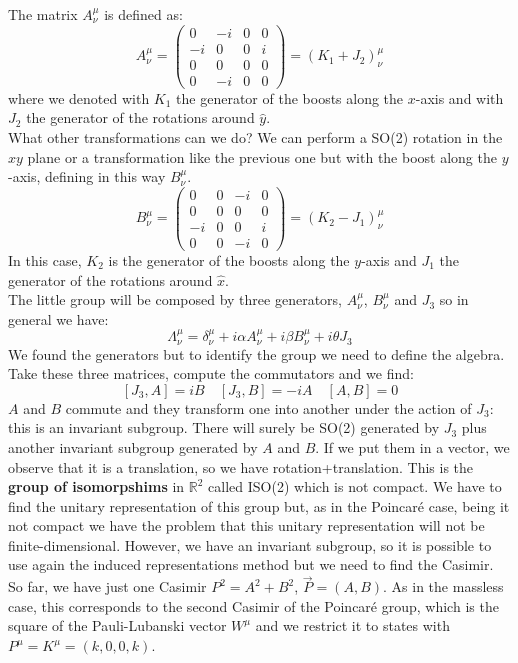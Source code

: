 \documentclass[../main.tex]{subfiles}
\begin{document}
The matrix $A^\mu_\nu$ is defined as:
\[
A^\mu_\nu=\left(\begin{array}{cccc}
    0 & -i & 0 & 0 \\
    -i & 0 & 0 & i \\
    0 & 0 & 0 & 0 \\
    0 & -i & 0 & 0
\end{array}\right)=(K_1+J_2)^\mu_\nu
\]
where we denoted with $K_1$ the generator of the boosts along the $x$-axis and with $J_2$ the generator of the rotations around $\hat{y}$.\\
What other transformations can we do? We can perform a SO(2) rotation in the $xy$ plane or a transformation like the previous one but with the boost along the $y$-axis, defining in this way $B^\mu_\nu$.
\[
B^\mu_\nu=\left(\begin{array}{cccc}
    0 & 0 & -i & 0 \\
    0 & 0 & 0 & 0 \\
    -i & 0 & 0 & i \\
    0 & 0 & -i & 0
\end{array}\right)=(K_2-J_1)^\mu_\nu
\]
In this case, $K_2$ is the generator of the boosts along the $y$-axis and $J_1$ the generator of the rotations around $\hat{x}$.\\
The little group will be composed by three generators, $A^\mu_\nu$, $B^\mu_\nu$ and $J_3$ so in general we have:
\[
\Lambda^\mu_\nu=\delta^\mu_\nu+i\alpha A^\mu_\nu+i\beta B^\mu_\nu+i\theta J_3
\]
We found the generators but to identify the group we need to define the algebra. Take these three matrices, compute the commutators and we find:
\[
[J_3,A]=iB \quad [J_3,B]=-iA \quad [A,B]=0
\]
$A$ and $B$ commute and they transform one into another under the action of $J_3$: this is an invariant subgroup. There will surely be SO(2) generated by $J_3$ plus another invariant subgroup generated by $A$ and $B$. If we put them in a vector, we observe that it is a translation, so we have rotation+translation. This is the \textbf{group of isomorpshims} in $\mathbb{R}^2$ called ISO(2) which is not compact. We have to find the unitary representation of this group but, as in the Poincaré case, being it not compact we have the problem that this unitary representation will not be finite-dimensional. However, we have an invariant subgroup, so it is possible to use again the induced representations method but we need to find the Casimir. So far, we have just one Casimir $P^2=A^2+B^2$, $\vec{P}=(A,B)$. As in the massless case, this corresponds to the second Casimir of the Poincaré group, which is the square of the Pauli-Lubanski vector $W^\mu$ and we restrict it to states with $P^\mu=K^\mu=(k,0,0,k)$.
\end{document}
